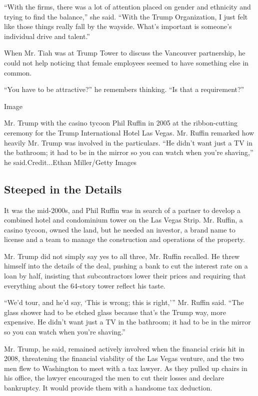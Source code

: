 ``With the firms, there was a lot of attention placed on gender and
ethnicity and trying to find the balance,'' she said. ``With the Trump
Organization, I just felt like those things really fall by the wayside.
What's important is someone's individual drive and talent.''

When Mr. Tiah was at Trump Tower to discuss the Vancouver partnership,
he could not help noticing that female employees seemed to have
something else in common.

``You have to be attractive?'' he remembers thinking. ``Is that a
requirement?''

Image

Mr. Trump with the casino tycoon Phil Ruffin in 2005 at the
ribbon-cutting ceremony for the Trump International Hotel Las Vegas. Mr.
Ruffin remarked how heavily Mr. Trump was involved in the particulars.
``He didn't want just a TV in the bathroom; it had to be in the mirror
so you can watch when you're shaving,'' he said.Credit...Ethan
Miller/Getty Images

\hypertarget{steeped-in-the-details}{%
\subsection{Steeped in the Details}\label{steeped-in-the-details}}

It was the mid-2000s, and Phil Ruffin was in search of a partner to
develop a combined hotel and condominium tower on the Las Vegas Strip.
Mr. Ruffin, a casino tycoon, owned the land, but he needed an investor,
a brand name to license and a team to manage the construction and
operations of the property.

Mr. Trump did not simply say yes to all three, Mr. Ruffin recalled. He
threw himself into the details of the deal, pushing a bank to cut the
interest rate on a loan by half, insisting that subcontractors lower
their prices and requiring that everything about the 64-story tower
reflect his taste.

``We'd tour, and he'd say, `This is wrong; this is right,''' Mr. Ruffin
said. ``The glass shower had to be etched glass because that's the Trump
way, more expensive. He didn't want just a TV in the bathroom; it had to
be in the mirror so you can watch when you're shaving.''

Mr. Trump, he said, remained actively involved when the financial crisis
hit in 2008, threatening the financial viability of the Las Vegas
venture, and the two men flew to Washington to meet with a tax lawyer.
As they pulled up chairs in his office, the lawyer encouraged the men to
cut their losses and declare bankruptcy. It would provide them with a
handsome tax deduction.


